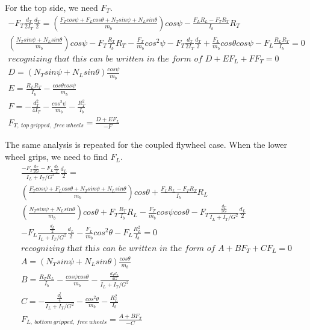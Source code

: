 \documentclass[10pt,letterpaper]{article}
\begin{document}
For the top side, we need $F_T$.
\begin{align}
	- F_T \frac{d_T}{2 I_T} \frac{d_T}{2} = (\frac{F_T cos \psi + F_L cos \theta + N_T sin \psi + N_L sin \theta}{m_b}) cos \psi - \frac{F_L R_L - F_T R_T}{I_b} R_T \\
	(\frac{N_T sin \psi + N_L sin \theta}{m_b}) cos \psi - F_T \frac{R_T}{I_b} R_T - \frac{F_T}{m_b} cos^2 \psi - F_T \frac{d_T}{2 I_T} \frac{d_T}{2} + \frac{F_L}{m_b} cos \theta cos \psi - F_L \frac{R_L R_T}{I_b} = 0\\
	\textit{recognizing that this can be written in the form of } D + E F_L + F F_T = 0 \\
	D = (N_T sin \psi + N_L sin \theta) \frac{cos \psi}{m_b} \\
	E = \frac{R_L R_T}{I_b} - \frac{cos \theta cos \psi}{m_b} \\
	F = - \frac{d_T^2}{4 I_T} - \frac{cos^2 \psi}{m_b} - \frac{R_T^2}{I_b} \\
	F_{T,\ top\ gripped,\ free\ wheels} = \frac{D + E F_L}{- F}
\end{align}

The same analysis is repeated for the coupled flywheel case. When the lower wheel grips, we need to find $F_L$.
\begin{align}
	\frac{- F_T \frac{d_T}{2 G} - F_L \frac{d_L}{2}}{I_L + I_T / G^2} \frac{d_L}{2} = \nonumber \\
	(\frac{F_T cos \psi + F_L cos \theta + N_T sin \psi + N_L sin \theta}{m_b}) cos \theta + \frac{F_L R_L - F_T R_T}{I_b} R_L \\
	(\frac{N_T sin \psi + N_L sin \theta}{m_b}) cos \theta + F_T \frac{R_T}{I_b} R_L - \frac{F_T}{m_b} cos \psi cos \theta - F_T \frac{\frac{d_T}{2 G}}{I_L + I_T / G^2} \frac{d_L}{2} \nonumber \\
	- F_L \frac{\frac{d_L}{2}}{I_L + I_T / G^2} \frac{d_L}{2} - \frac{F_L}{m_b} cos^2 \theta - F_L \frac{R_L^2}{I_b} = 0\\
	\textit{recognizing that this can be written in the form of } A + B F_T + C F_L = 0 \\
	A = (N_T sin \psi + N_L sin \theta) \frac{cos \theta}{m_b} \\
	B = \frac{R_T R_L}{I_b} - \frac{cos \psi cos \theta}{m_b} - \frac{\frac{d_T d_L}{4 G}}{I_L + I_T / G^2} \\
	C = - \frac{\frac{d_L^2}{4}}{I_L + I_T / G^2} - \frac{cos^2 \theta}{m_b} - \frac{R_L^2}{I_b} \\
	F_{L,\ bottom\ gripped,\ free\ wheels} = \frac{A + B F_T}{- C}
\end{align}
\end{document}

